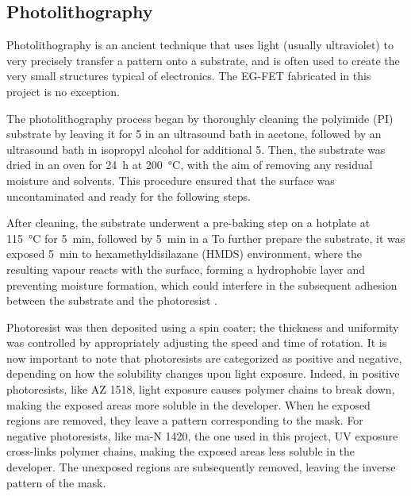 \subsection{Photolithography}
\label{sec:lithography}


Photolithography is an ancient technique that uses light (usually ultraviolet) to very precisely transfer a pattern onto a substrate, and is often used to create the very small structures typical of electronics. The EG-FET fabricated in this project is no exception.

The photolithography process began by thoroughly cleaning the polyimide (PI) substrate by leaving it for \SI{5}{\min} in an ultrasound bath in acetone, followed by an ultrasound bath in isopropyl alcohol for additional \SI{5}{\min}.
Then, the substrate was dried in an oven for \SI{24}{\hour} at \SI{200}{\celsius}, with the aim of removing any residual moisture and solvents. This procedure ensured that the surface was uncontaminated and ready for the following steps.

After cleaning, the substrate underwent a pre-baking step on a hotplate at \SI{115}{\celsius} for \SI{5}{\minute}, followed by \SI{5}{\minute} in a 
To further prepare the substrate, it was exposed \SI{5}{\minute} to hexamethyldisilazane (HMDS) environment, where the resulting vapour reacts with the surface, forming a hydrophobic layer and preventing moisture formation, which could interfere in the subsequent adhesion between the substrate and the photoresist \citep{pollentierBake2022}.

Photoresist was then deposited using a spin coater; the thickness and uniformity was controlled by appropriately adjusting the speed and time of rotation.
It is now important to note that photoresists are categorized as positive and negative, depending on how the solubility changes upon light exposure. Indeed, in positive photoresists, like AZ 1518, light exposure causes polymer chains to break down, making the exposed areas more soluble in the developer. When he exposed regions are removed, they leave a pattern corresponding to the mask. For negative photoresists, like ma-N 1420, the one used in this project, UV exposure cross-links polymer chains, making the exposed areas less soluble in the developer. The unexposed regions are subsequently removed, leaving the inverse pattern of the mask.

